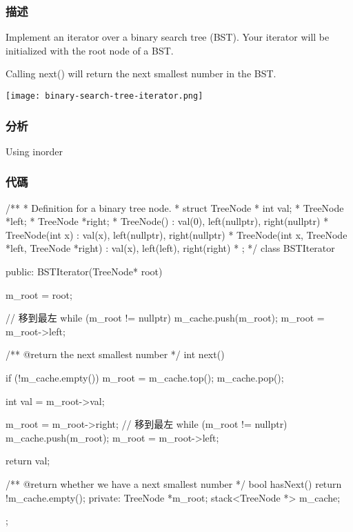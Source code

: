 \subsubsection{描述}
Implement an iterator over a binary search tree (BST). Your iterator will be initialized with the root node of a BST.

Calling next() will return the next smallest number in the BST.

\begin{center}
\texttt{[image: binary-search-tree-iterator.png]}\\
\label{fig:binary-search-tree-iterator}
\end{center}

\subsubsection{分析}
Using inorder

\subsubsection{代碼}
\begin{Code}
/**
 * Definition for a binary tree node.
 * struct TreeNode {
 *     int val;
 *     TreeNode *left;
 *     TreeNode *right;
 *     TreeNode() : val(0), left(nullptr), right(nullptr) {}
 *     TreeNode(int x) : val(x), left(nullptr), right(nullptr) {}
 *     TreeNode(int x, TreeNode *left, TreeNode *right) : val(x), left(left), right(right) {}
 * };
 */
class BSTIterator {
public:
    BSTIterator(TreeNode* root) {
        m_root = root;

        // 移到最左
        while (m_root != nullptr)
        {
            m_cache.push(m_root);
            m_root = m_root->left;
        }
    }

    /** @return the next smallest number */
    int next() {
        if (!m_cache.empty())
        {
            m_root = m_cache.top();
            m_cache.pop();
        }

        int val = m_root->val;

        m_root = m_root->right;
        // 移到最左
        while (m_root != nullptr)
        {
            m_cache.push(m_root);
            m_root = m_root->left;
        }

        return val;
    }

    /** @return whether we have a next smallest number */
    bool hasNext() {
        return !m_cache.empty();
    }
private:
    TreeNode *m_root;
    stack<TreeNode *> m_cache;
};
\end{Code}
